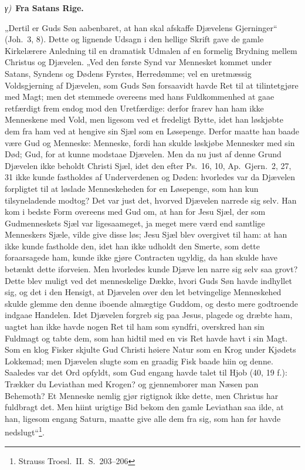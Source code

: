 \documentclass[12pt]{book}
\newcommand{\greekrun}[2]{%
  \medskip\begin{center}{\itshape #1)}\ {\bfseries #2}\end{center}\medskip}
\begin{document}
\greekrun{γ}{Fra Satans Rige.}

„Dertil er Guds Søn aabenbaret, at han skal afskaffe Djævelens
Gjerninger“ (Joh.\ 3, 8). Dette og lignende Udsagn i den hellige
Skrift gave de gamle Kirkelærere Anledning til en dramatisk Udmalen
af en formelig Brydning mellem Christus og Djævelen. „Ved den første
Synd var Mennesket kommet under Satans, Syndens og Dødens Fyrstes,
Herredømme; vel en uretmæssig Voldsgjerning af Djævelen, som Guds
Søn forsaavidt havde Ret til at tilintetgjøre med Magt; men det
stemmede overeens med hans Fuldkommenhed at gaae retfærdigt frem
endog mod den Uretfærdige: derfor frarev han ham ikke Menneskene med
Vold, men ligesom ved et fredeligt Bytte, idet han løskjøbte dem fra
ham ved at hengive sin Sjæl som en Løsepenge. Derfor maatte han
baade være Gud og Menneske: Menneske, fordi han skulde løskjøbe
Mennesker med sin Død; Gud, for at kunne modstaae Djævelen. Men da
nu just af denne Grund Djævelen ikke beholdt Christi Sjæl, idet den
efter Ps.\ 16, 10, Ap.\ Gjern.\ 2, 27, 31 ikke kunde fastholdes af
Underverdenen og Døden: hvorledes var da Djævelen forpligtet til at
løslade Menneskeheden for en Løsepenge, som han kun tilsyneladende
modtog? Det var just det, hvorved Djævelen narrede sig selv. Han kom
i bedste Form overeens med Gud om, at han for Jesu Sjæl, der som
Gudmenneskets Sjæl var ligesaameget, ja meget mere værd end samtlige
Menneskers Sjæle, vilde give disse løs; Jesu Sjæl blev overgivet til
ham: at han ikke kunde fastholde den, idet han ikke udholdt den
Smerte, som dette foraarsagede ham, kunde ikke gjøre Contracten
ugyldig, da han skulde have betænkt dette iforveien. Men hvorledes
kunde Djæve\-
len narre sig selv saa grovt? Dette blev muligt ved det menneskelige
Dække, hvori Guds Søn havde indhyllet sig, og det i den Hensigt, at
Djævelen over den let betvingelige Menneskehed skulde glemme den
denne iboende almægtige Guddom, og desto mere godtroende indgaae
Handelen. Idet Djævelen forgreb sig paa Jesus, plagede og dræbte
ham, uagtet han ikke havde nogen Ret til ham som syndfri, overskred
han sin Fuldmagt og tabte dem, som han hidtil med en vis Ret havde
havt i sin Magt. Som en klog Fisker skjulte Gud Christi høiere Natur
som en Krog under Kjødets Lokkemad; men Djævelen slugte som en
graadig Fisk baade hiin og denne. Saaledes var det Ord opfyldt, som
Gud engang havde talet til Hjob (40, 19 f.): Trækker du Leviathan
med Krogen? og gjennemborer man Næsen pan Behemoth? Et Menneske
nemlig gjør rigtignok ikke dette, men Christus har fuldbragt det.
Men hiint urigtige Bid bekom den gamle Leviathan saa ilde, at han,
ligesom engang Saturn, maatte give alle dem fra sig, som han før
havde nedslugt“\footnote{Strauss Troesl.\ II.\ S.\ 203--206}.
\end{document}
